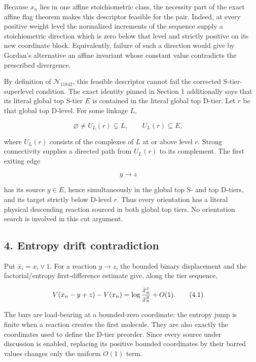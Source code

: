 Because \(x_n\) lies in one affine stoichiometric class, the necessity
part of the exact affine flag theorem makes this descriptor feasible for
the pair. Indeed, at every positive weight level the normalized
increments of the sequence supply a stoichiometric direction which is
zero below that level and strictly positive on its new coordinate block.
Equivalently, failure of such a direction would give by Gordan's
alternative an affine invariant whose constant value contradicts the
prescribed divergence.

By definition of \(\mathcal N_{11842}\), this feasible descriptor cannot
fail the corrected S-tier-superlevel condition. The exact identity
pinned in Section 1 additionally says that its literal global top S-tier
\(E\) is contained in the literal global top D-tier. Let \(r\) be that
global top D-level. For some linkage \(L\),

\[
 \varnothing\ne U_L(r)\subsetneq L,
 \qquad U_L(r)\subseteq E,                            \tag{3.2}
\]

where \(U_L(r)\) consists of the complexes of \(L\) at or above level
\(r\). Strong connectivity supplies a directed path from \(U_L(r)\) to
its complement. The first exiting edge

\[
                              y\longrightarrow z       \tag{3.3}
\]

has its source \(y\in E\), hence simultaneously in the global top S- and
top D-tiers, and its target strictly below D-level \(r\). Thus every
orientation has a literal physical descending reaction sourced in both
global top tiers. No orientation search is involved in this cut
argument.

\subsection{4. Entropy drift
contradiction}

Put \(\bar x_i=x_i\vee1\). For a reaction \(y\to z\), the bounded binary
displacement and the factorial/entropy first-difference estimate give,
along the tier sequence,

\[
 V(x_n-y+z)-V(x_n)
       =\log {\bar x_n^z\over\bar x_n^y}+O(1).       \tag{4.1}
\]

The bars are load-bearing at a bounded-zero coordinate: the entropy jump
is finite when a reaction creates the first molecule. They are also
exactly the coordinates used to define the D-tier preorder. Since every
source under discussion is enabled, replacing its positive bounded
coordinates by their barred values changes only the uniform \(O(1)\)
term.

